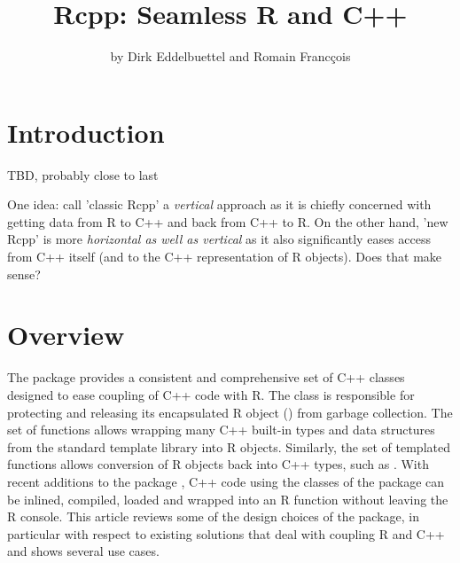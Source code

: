 
\title{Rcpp: Seamless R and C++}
\author{by Dirk Eddelbuettel and Romain Franc\c{c}ois}

\maketitle


\section{Introduction}

TBD, probably close to last

One idea: call 'classic Rcpp' a \textsl{vertical} approach as it is chiefly
concerned with getting data from R to C++ and back from C++ to R. On the
other hand, 'new Rcpp' is more \textsl{horizontal as well as vertical} as it
also significantly eases access from C++ itself (and to the C++
representation of R objects).  Does that make sense?

\section{Overview}


The  package provides a consistent and comprehensive set 
of C++ classes designed to ease coupling of C++ code
with R. The  class is responsible for 
protecting and releasing its encapsulated R object ()
from garbage collection. The  set of functions allows
wrapping many C++ built-in types and data structures from the standard
template library into R objects. Similarly, the  set of 
templated functions allows conversion of R objects back into C++
types, such as . With recent additions to the 
 package \citep{cran:inline}, 
C++ code using the classes of the 
 package can be inlined, compiled, loaded and wrapped 
into an R function without leaving the R console. 
This article reviews some of the design choices of the
 package, in particular with respect to existing solutions
that deal with coupling R and C++ and shows several use cases.

